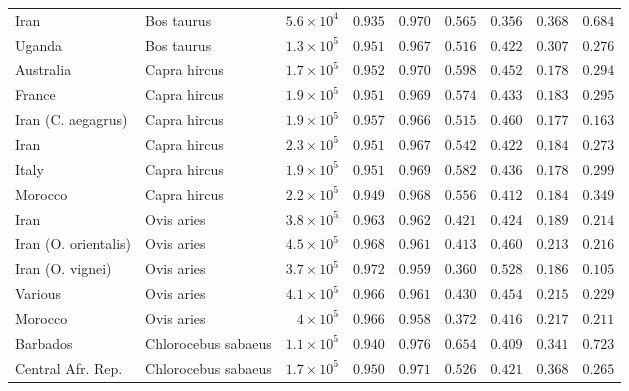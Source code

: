 \documentclass{article}
\begin{document}
\begin{center}
\begin{adjustbox}{width=\textwidth}
\begin{tabular}{||l|l|r||r|r||r|r||r|r||}
                Iran & Bos taurus & $5.6\times 10^{4}$ & $ 0.935$ & $ 0.970$ & $ 0.565$ & $ 0.356$ & $ 0.368$ & $ 0.684$ \\
                Uganda & Bos taurus & $1.3\times 10^{5}$ & $ 0.951$ & $ 0.967$ & $ 0.516$ & $ 0.422$ & $ 0.307$ & $ 0.276$ \\
                \rowcolor{LIGHTGREY} Australia & Capra hircus & $1.7\times 10^{5}$ & $ 0.952$ & $ 0.970$ & $ 0.598$ & $ 0.452$ & $ 0.178$ & $ 0.294$ \\
                \rowcolor{LIGHTGREY} France & Capra hircus & $1.9\times 10^{5}$ & $ 0.951$ & $ 0.969$ & $ 0.574$ & $ 0.433$ & $ 0.183$ & $ 0.295$ \\
                \rowcolor{LIGHTGREY} Iran (C. aegagrus) & Capra hircus & $1.9\times 10^{5}$ & $ 0.957$ & $ 0.966$ & $ 0.515$ & $ 0.460$ & $ 0.177$ & $ 0.163$ \\
                \rowcolor{LIGHTGREY} Iran & Capra hircus & $2.3\times 10^{5}$ & $ 0.951$ & $ 0.967$ & $ 0.542$ & $ 0.422$ & $ 0.184$ & $ 0.273$ \\
                \rowcolor{LIGHTGREY} Italy & Capra hircus & $1.9\times 10^{5}$ & $ 0.951$ & $ 0.969$ & $ 0.582$ & $ 0.436$ & $ 0.178$ & $ 0.299$ \\
                \rowcolor{LIGHTGREY} Morocco & Capra hircus & $2.2\times 10^{5}$ & $ 0.949$ & $ 0.968$ & $ 0.556$ & $ 0.412$ & $ 0.184$ & $ 0.349$ \\
                Iran & Ovis aries & $3.8\times 10^{5}$ & $ 0.963$ & $ 0.962$ & $ 0.421$ & $ 0.424$ & $ 0.189$ & $ 0.214$ \\
                Iran (O. orientalis) & Ovis aries & $4.5\times 10^{5}$ & $ 0.968$ & $ 0.961$ & $ 0.413$ & $ 0.460$ & $ 0.213$ & $ 0.216$ \\
                Iran (O. vignei) & Ovis aries & $3.7\times 10^{5}$ & $ 0.972$ & $ 0.959$ & $ 0.360$ & $ 0.528$ & $ 0.186$ & $ 0.105$ \\
                Various & Ovis aries & $4.1\times 10^{5}$ & $ 0.966$ & $ 0.961$ & $ 0.430$ & $ 0.454$ & $ 0.215$ & $ 0.229$ \\
                Morocco & Ovis aries & $ 4\times 10^{5}$ & $ 0.966$ & $ 0.958$ & $ 0.372$ & $ 0.416$ & $ 0.217$ & $ 0.211$ \\
                \rowcolor{LIGHTGREY} Barbados & Chlorocebus sabaeus & $1.1\times 10^{5}$ & $ 0.940$ & $ 0.976$ & $ 0.654$ & $ 0.409$ & $ 0.341$ & $ 0.723$ \\
                \rowcolor{LIGHTGREY} Central Afr. Rep. & Chlorocebus sabaeus & $1.7\times 10^{5}$ & $ 0.950$ & $ 0.971$ & $ 0.526$ & $ 0.421$ & $ 0.368$ & $ 0.265$ \\

\end{tabular}
\end{adjustbox}
\end{center}
\end{document}
